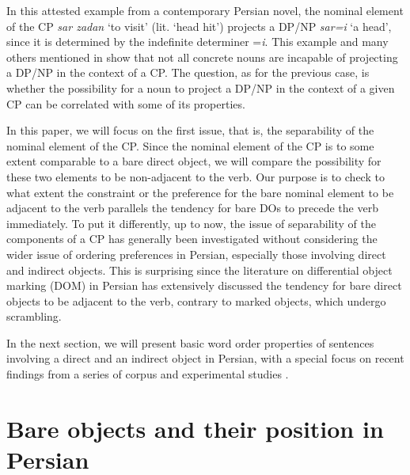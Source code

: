 \documentclass[output=paper]{langsci/langscibook}
\begin{document}
In this attested example from a contemporary Persian novel, the nominal element of the CP \textit{sar zadan} `to visit' (lit. `head hit') projects a DP/NP \textit{sar=i} `a head', since it is determined by the indefinite determiner =\textit{i}. This example and many others mentioned in \citet{Samvelian2012} show that not all concrete nouns are incapable of projecting a DP/NP in the context of a CP. The question, as for the previous case, is whether the possibility for a noun to project a DP/NP in the context of a given CP can be correlated with some of its properties.

In this paper, we will focus on the first issue, that is, the separability of the nominal element of the CP. Since the nominal element of the CP is to some extent comparable to a bare direct object, we will compare the possibility for these two elements to be non-adjacent to the verb. Our purpose is to check to what extent the constraint or the preference for the bare nominal element to be adjacent to the verb parallels the tendency for bare DOs to  precede the verb immediately. To put it differently, up to now, the issue of  separability of the components of a CP has generally been investigated without considering the wider issue of ordering preferences in Persian, especially those involving direct and indirect objects. This is surprising since the literature on differential object marking (DOM) in Persian has extensively discussed the tendency for bare direct objects to be adjacent to the verb, contrary to marked objects, which undergo scrambling. 

In the next section, we will present basic word order properties of sentences involving a direct and an indirect object in Persian, with a special focus on recent findings from a series of corpus and experimental studies \citep{FaghiriPhd,FagSam2014,FagSamHem2014,FagSamHem2018}.



\section{Bare objects and their position in Persian}\label{Sec:WO}
\end{document}
